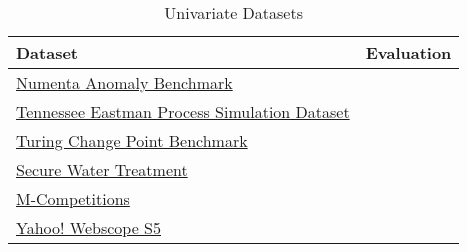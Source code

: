 \begin{table}[h]\centering
        \begin{tabular}{ll}
            Dataset                                                                                                                             & Evaluation    \\\midrule
            \href{https://github.com/numenta/NAB}{Numenta Anomaly Benchmark}                                                                    &               \\\addlinespace
            \href{https://www.kaggle.com/averkij/tennessee-eastman-process-simulation-dataset}{Tennessee Eastman Process Simulation Dataset}    &               \\\addlinespace
            \href{https://github.com/alan-turing-institute/TCPDBench}{Turing Change Point Benchmark}                                            &               \\\addlinespace
            \href{https://itrust.sutd.edu.sg/testbeds/secure-water-treatment-swat/}{Secure Water Treatment}                                     &               \\\addlinespace
            \href{https://en.wikipedia.org/wiki/Makridakis\_Competitions}{M-Competitions}                                                       &               \\\addlinespace
            \href{https://webscope.sandbox.yahoo.com/catalog.php?datatype=s\&did=70}{Yahoo! Webscope S5}                                        &               \\
        \end{tabular}
    \caption{Univariate Datasets}\label{tab:datasets}
\end{table}

